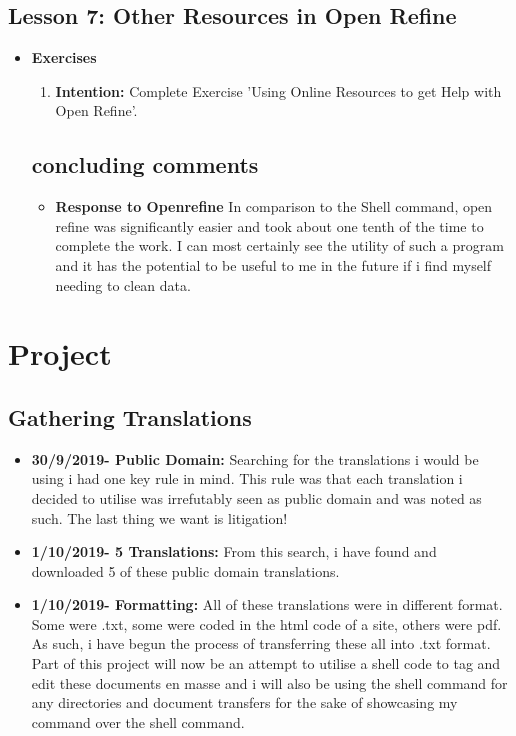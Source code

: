 \documentclass{article}
\begin{document}
\subsection{Lesson 7: Other Resources in Open Refine}

\begin{itemize}
\item{\textbf{Exercises}}

\begin{enumerate}

\item{\textbf{Intention:} Complete Exercise 'Using Online Resources to get Help with Open Refine'.}


\end{enumerate}


\subsection{concluding comments}
\begin{itemize}
\item{\textbf{Response to Openrefine} In comparison to the Shell command, open refine was significantly easier and took about one tenth of the time to complete the work. I can most certainly see the utility of such a program and it has the potential to be useful to me in the future if i find myself needing to clean data.} 
\end{itemize}
\end{itemize}

\section{Project}
\subsection{Gathering Translations}

\begin{itemize}

\item{\textbf{ 30/9/2019- Public Domain:} Searching for the translations i would be using i had one key rule in mind. This rule was that each translation i decided to utilise was irrefutably seen as public domain and was noted as such. The last thing we want is litigation!}

\item{\textbf{1/10/2019- 5 Translations:} From this search, i have found and downloaded 5 of these public domain translations.}

\item{\textbf{1/10/2019- Formatting:} All of these translations were in different format. Some were .txt, some were coded in the html code of a site, others were pdf. As such, i have begun the process of transferring these all into .txt format. Part of this project will now be an attempt to utilise a shell code to tag and edit these documents en masse and i will also be using the shell command for any directories and document transfers for the sake of showcasing my command over the shell command.}
 
\end{itemize}
\end{document}
